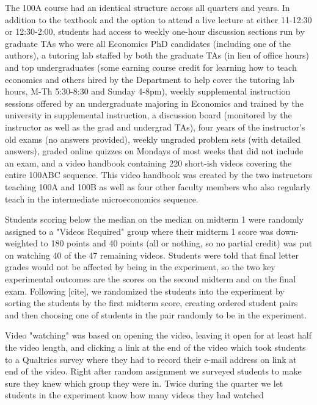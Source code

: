 \documentclass[12pt]{article}
\begin{document}
The 100A course had an identical structure across all quarters and years.  In addition to the textbook and the option to attend a live lecture at either 11-12:30 or 12:30-2:00, students had access to weekly one-hour discussion sections run by graduate TAs who were all Economics PhD candidates (including one of the authors), a tutoring lab staffed by both the graduate TAs (in lieu of office hours) and top undergraduates (some earning course credit for learning how to teach economics and others hired by the Department to help cover the tutoring lab hours, M-Th 5:30-8:30 and Sunday 4-8pm), weekly supplemental instruction sessions offered by an undergraduate majoring in Economics and trained by the university in supplemental instruction, a discussion board (monitored by the instructor as well as the grad and undergrad TAs), four years of the instructor's old exams (no answers provided), weekly ungraded problem sets (with detailed answers), graded online quizzes on Mondays of most weeks that did not include an exam, and a video handbook containing 220 short-ish videos covering the entire 100ABC sequence.  This video handbook was created by the two instructors teaching 100A and 100B as well as four other faculty members who also regularly teach in the intermediate microeconomics sequence. 

Students scoring below the median on the median on midterm 1 were randomly assigned to a "Videos Required" group where their midterm 1 score was down-weighted to 180 points and 40 points (all or nothing, so no partial credit) was put on watching 40 of the 47 remaining videos.  Students were told that final letter grades would not be affected by being in the experiment, so the two key experimental outcomes are the scores on the second midterm and on the final exam.  Following [cite], we randomized the students into the experiment by sorting the students by the first midterm score, creating ordered student pairs and then choosing one of students in the pair randomly to be in the experiment.  

Video "watching" was based on opening the video, leaving it open for at least half the video length, and clicking a link at the end of the video which took students to a Qualtrics survey where they had to record their e-mail address on link at end of the video.  Right after random assignment we surveyed students to make sure they knew which group they were in.  Twice during the quarter we let students in the experiment know how many videos they had watched 
\end{document}
